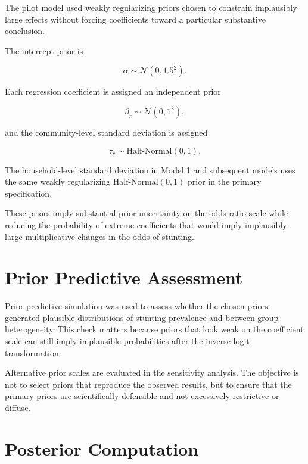 The pilot model used weakly regularizing priors chosen to constrain implausibly large effects without forcing coefficients toward a particular substantive conclusion.

The intercept prior is

\begin{equation}
\alpha \sim \mathcal{N}(0,1.5^2).
\end{equation}

Each regression coefficient is assigned an independent prior

\begin{equation}
\beta_r \sim \mathcal{N}(0,1^2),
\end{equation}

and the community-level standard deviation is assigned

\begin{equation}
\tau_c \sim \text{Half-Normal}(0,1).
\end{equation}

The household-level standard deviation in Model 1 and subsequent models uses the same weakly regularizing $\text{Half-Normal}(0,1)$ prior in the primary specification.

These priors imply substantial prior uncertainty on the odds-ratio scale while reducing the probability of extreme coefficients that would imply implausibly large multiplicative changes in the odds of stunting.

\section{Prior Predictive Assessment}

Prior predictive simulation was used to assess whether the chosen priors generated plausible distributions of stunting prevalence and between-group heterogeneity. This check matters because priors that look weak on the coefficient scale can still imply implausible probabilities after the inverse-logit transformation.

Alternative prior scales are evaluated in the sensitivity analysis. The objective is not to select priors that reproduce the observed results, but to ensure that the primary priors are scientifically defensible and not excessively restrictive or diffuse.

\section{Posterior Computation}

